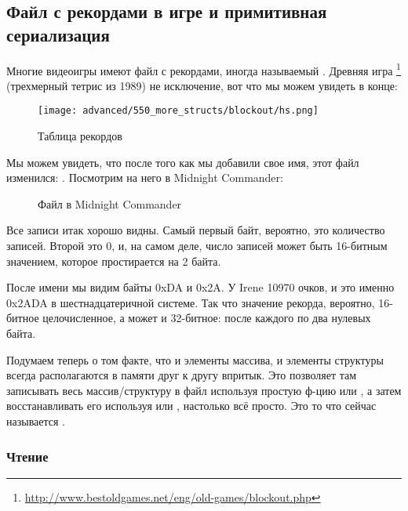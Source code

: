 \subsection{Файл с рекордами в игре  и примитивная сериализация}

Многие видеоигры имеют файл с рекордами, иногда называемый .
Древняя игра \footnote{\url{http://www.bestoldgames.net/eng/old-games/blockout.php}}
(трехмерный тетрис из 1989) не исключение, вот что мы можем увидеть в конце:

\begin{figure}[H]
\centering
\texttt{[image: advanced/550\_more\_structs/blockout/hs.png]}
\caption{Таблица рекордов}
\end{figure}

Мы можем увидеть, что после того как мы добавили свое имя, этот файл изменился: .
Посмотрим на него в Midnight Commander:

\begin{figure}[H]
\centering
{}
\caption{Файл  в Midnight Commander}
\end{figure}

Все записи итак хорошо видны.
Самый первый байт, вероятно, это количество записей.
Второй это 0, и, на самом деле, число записей может быть 16-битным значением, которое простирается на 2 байта.

После имени  мы видим байты 0xDA и 0x2A.
У Irene 10970 очков, и это именно 0x2ADA в шестнадцатеричной системе.
Так что значение рекорда, вероятно, 16-битное целочисленное, а может и 32-битное: после каждого по два нулевых байта.

Подумаем теперь о том факте, что и элементы массива, и элементы структуры всегда располагаются в памяти друг к другу впритык.
Это позволяет там записывать весь массив/структуру в файл используя простую ф-цию  или , 
а затем восстанавливать его используя  или , настолько всё просто.
Это то что сейчас называется .

\subsubsection{Чтение}

